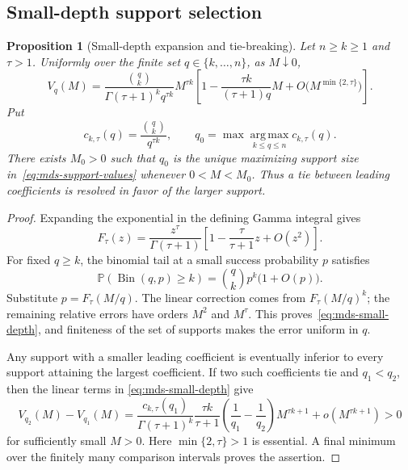 \documentclass[11pt]{article}
\newtheorem{proposition}[theorem]{Proposition}
\theoremstyle{definition}
\theoremstyle{remark}
\DeclareMathOperator{\Bin}{Bin}
\newcommand{\Pbb}{\mathbb P}
\newcommand{\1}{\mathbf 1}
\begin{document}
\subsection{Small-depth support selection}

\begin{proposition}[Small-depth expansion and tie-breaking]
\label{prop:mds-small-depth}
Let \(n\ge k\ge1\) and \(\tau>1\).  Uniformly over the finite set
\(q\in\{k,\ldots,n\}\), as \(M\downarrow0\),
\begin{equation}\label{eq:mds-small-depth}
  V_q(M)
  =\frac{\binom qk}{\Gamma(\tau+1)^kq^{\tau k}}M^{\tau k}
   \left[
     1-\frac{\tau k}{(\tau+1)q}M
     +O\bigl(M^{\min\{2,\tau\}}\bigr)
   \right].
\end{equation}
Put
\begin{equation}\label{eq:mds-leading-coefficient}
  c_{k,\tau}(q)=\frac{\binom qk}{q^{\tau k}},
  \qquad
  q_0=\max\operatorname*{arg\,max}_{k\le q\le n}c_{k,\tau}(q).
\end{equation}
There exists \(M_0>0\) such that \(q_0\) is the unique maximizing
support size in~\eqref{eq:mds-support-values} whenever \(0<M<M_0\).
Thus a tie between leading coefficients is resolved in favor of the
larger support.
\end{proposition}

\begin{proof}
Expanding the exponential in the defining Gamma integral gives
\[
  F_\tau(z)
  =\frac{z^\tau}{\Gamma(\tau+1)}
    \left[1-\frac{\tau}{\tau+1}z+O(z^2)\right].
\]
For fixed \(q\ge k\), the binomial tail at a small success probability
\(p\) satisfies
\[
  \Pbb(\Bin(q,p)\ge k)=\binom qk p^k\bigl(1+O(p)\bigr).
\]
Substitute \(p=F_\tau(M/q)\).  The linear correction comes from
\(F_\tau(M/q)^k\); the remaining relative errors have orders
\(M^2\) and \(M^\tau\).  This proves~\eqref{eq:mds-small-depth},
and finiteness of the set of supports makes the error uniform in \(q\).

Any support with a smaller leading coefficient is eventually inferior
to every support attaining the largest coefficient.  If two such
coefficients tie and \(q_1<q_2\), then the linear terms in
\eqref{eq:mds-small-depth} give
\[
  V_{q_2}(M)-V_{q_1}(M)
  =\frac{c_{k,\tau}(q_1)}{\Gamma(\tau+1)^k}
    \frac{\tau k}{\tau+1}
    \left(\frac1{q_1}-\frac1{q_2}\right)M^{\tau k+1}
    +o(M^{\tau k+1})>0
\]
for sufficiently small \(M>0\).  Here
\(\min\{2,\tau\}>1\) is essential.  A final minimum over the
finitely many comparison intervals proves the assertion.
\end{proof}
\end{document}
